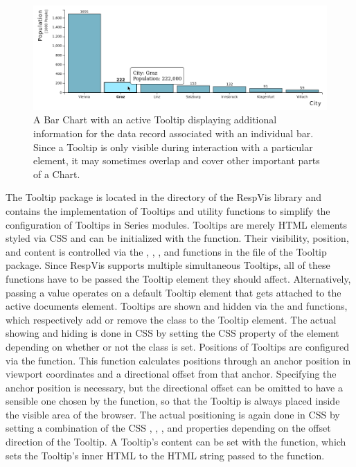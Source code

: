 \begin{figure}[tp]
\centering
\includegraphics[keepaspectratio,width=\linewidth,height=\fullh]
{images/tooltip.png}
\caption[Tooltip Example]{%
A Bar Chart with an active Tooltip displaying
additional information for the data record associated with an
individual bar. Since a Tooltip is only visible during
interaction with a particular element, it may sometimes overlap
and cover other important parts of a Chart.
}
\label{fig:Tooltip}
\end{figure}


The Tooltip package is located in the
 directory of the RespVis library and contains
the implementation of Tooltips and utility functions to simplify the
configuration of Tooltips in Series modules. Tooltips are merely HTML
 elements styled via CSS and can be initialized with the
 function. Their visibility, position, and content is
controlled via the , ,
, and  functions in the
 file of the Tooltip package. Since RespVis
supports multiple simultaneous Tooltips, all of these functions have
to be passed the Tooltip element they should affect. Alternatively,
passing a  value operates on a default Tooltip element that
gets attached to the active documents  element.
Tooltips are shown and hidden via the  and
 functions, which respectively add or remove the
 class to the Tooltip element. The actual showing and
hiding is done in CSS by setting the CSS  property of
the element depending on whether or not the  class is set.
Positions of Tooltips are configured via the 
function. This function calculates positions through an anchor
position in viewport coordinates and a directional offset from that
anchor. Specifying the anchor position is necessary, but the
directional offset can be omitted to have a sensible one chosen by the
 function, so that the Tooltip is always placed
inside the visible area of the browser. The actual positioning is
again done in CSS by setting a combination of the CSS ,
, , and  properties
depending on the offset direction of the Tooltip. A Tooltip's content
can be set with the  function, which sets the
Tooltip's inner HTML to the HTML string passed to the function.

